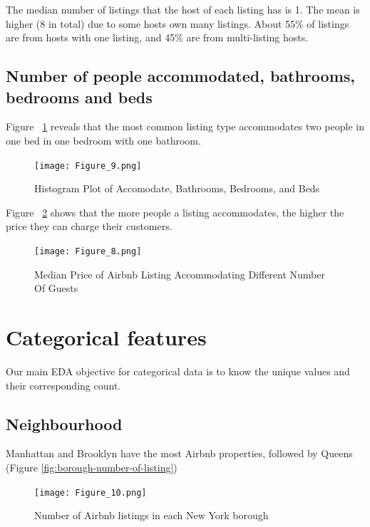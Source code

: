 The median number of listings that the host of each listing has is 1. The mean
is higher (8 in total) due to some hosts own many listings. About 55\% of
listings are from hosts with one listing, and 45\% are from multi-listing hosts.

\subsection{Number of people accommodated, bathrooms, bedrooms and beds}

Figure ~\ref{fig:hist-accommodates} reveals that the most common listing type accommodates two people in
one bed in one bedroom with one bathroom.

\begin{figure}[H] \centering
\caption{Histogram Plot of Accomodate, Bathrooms, Bedrooms, and Beds}
    \texttt{[image: Figure\_9.png]}
    \label{fig:hist-accommodates}
\end{figure}

Figure ~\ref{fig:median-price-accommodates} shows that the more people a listing accommodates, the higher the
price they can charge their customers.

\begin{figure}[H] \centering
\caption{Median Price of Airbnb Listing Accommodating Different Number Of Guests}
    \texttt{[image: Figure\_8.png]}
    \label{fig:median-price-accommodates}
\end{figure}

\section{Categorical features}
\label{sec:categorical_features}

Our main EDA objective for categorical data is to know the unique values and
their corresponding count.

\subsection{Neighbourhood}

Manhattan and Brooklyn have the most Airbnb properties, followed by
Queens (Figure \ref{fig:borough-number-of-listing})

\begin{figure}[H]\centering
    \caption{Number of Airbnb listings in each New York borough}
    \texttt{[image: Figure\_10.png]}
\end{figure}

